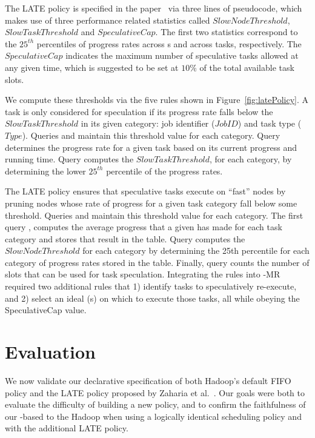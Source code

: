 The LATE policy is specified in the paper~\cite{zaharia-late} via three lines
of pseudocode, which makes use of three performance related statistics called
$SlowNodeThreshold$, $SlowTaskThreshold$ and $SpeculativeCap$.  The first two
statistics correspond to the $25^{th}$ percentiles of progress rates across
{\TT}s and across tasks, respectively.  The $SpeculativeCap$ indicates the
maximum number of speculative tasks allowed at any given time, which is
suggested to be set at $10\%$ of the total available task slots.

We compute these thresholds via the five \OVERLOG rules shown in
Figure~\ref{fig:latePolicy}.  A task is only considered for speculation if its
progress rate falls below the $SlowTaskThreshold$ in its given category: job
identifier ($JobID$) and task type ($Type$).  Queries  and 
maintain this threshold value for each category.  Query  determines the
progress rate for a given task based on its current progress and running time.
Query  computes the $SlowTaskThreshold$, for each category, by
determining the lower $25^{th}$ percentile of the progress rates.

The LATE policy ensures that speculative tasks execute on ``fast'' nodes by
pruning \TT nodes whose rate of progress for a given task category fall below
some threshold.  Queries  and  maintain this threshold value for
each category.  The first query , computes the average progress that a
given \TT has made for each task category and stores that result in the
 table.  Query  computes the $SlowNodeThreshold$ for each
category by determining the 25th percentile for each category of progress rates
stored in the  table.  Finally, query  counts the number
of slots that can be used for task speculation.  Integrating the rules into
\BOOM-MR required two additional \OVERLOG rules that 1) identify tasks to
speculatively re-execute, and 2) select an ideal {\TT}(s) on which to execute
those tasks, all while obeying the SpeculativeCap value.

\section{Evaluation}
\label{ch:boom:sec:eval}

We now validate our declarative specification of both Hadoop's default FIFO
policy and the LATE policy proposed by Zaharia et al.~\cite{zaharia-late}.  Our
goals were both to evaluate the difficulty of building a new policy, and to
confirm the faithfulness of our \OVERLOG-based {\JT} to the Hadoop {\JT} when
using a logically identical scheduling policy and with the additional LATE
policy.

